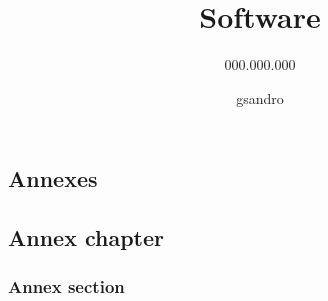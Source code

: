 \documentclass[
	confidential=true,					%
	lang=en,									%
	path=\template,						%
	changelog=references/revisions,	%
	openany									%
]{\template/latex-report}
\title{Software}								%
\subtitle{000.000.000}		%
\author{gsandro}		%
\begin{document}
	\inserttoc

	
	
	
	\insertbibliography						%
	\insertlob 								%
	\insertlof								%
	\insertlot								%
	\insertlol								%

	\begin{appendix}
		\part*{Annexes}
		\chapter{Annex chapter}
			\section{Annex section}
	\end{appendix}
\end{document}
